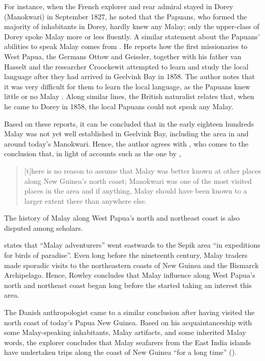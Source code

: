 {For instance, when the French explorer and rear admiral \citet[606]{DumontdUrville.1833} stayed in Dorey (Manokwari) in September 1827, he noted that the Papuans, who formed the majority of inhabitants in Dorey, hardly knew any Malay; only the upper-class of Dorey spoke Malay more or less fluently. A similar statement about the Papuans’ abilities to speak Malay comes from \citet{vanHasselt.1936}. He reports how the first missionaries to West Papua, the Germans Ottow and Geissler, together with his father van Hasselt and the  researcher Croockewit attempted to learn and study the local language after they had arrived in Geelvink Bay in 1858. The author notes that it was very difficult for them to learn the local language, as the Papuans knew little or no Malay \citep[116]{vanHasselt.1936}. Along similar lines, the British naturalist \citet[380]{Wallace.1890} relates that, when he came to Dorey in 1858, the local Papuans could not speak any Malay.



Based on these reports, it can be concluded that in the early eighteen hundreds Malay was not yet well established in Geelvink Bay, including the area in and around today’s Manokwari. Hence, the author agrees with \citet[73]{Seiler.1982}, who comes to the conclusion that, in light of accounts such as the one by \citet{DumontdUrville.1833},


\begin{quote}
[t]here is no reason to assume that Malay was better known at other places along New Guinea’s north coast; Manokwari was one of the most visited places in the area and if anything, Malay should have been known to a larger extent there than anywhere else.
\end{quote}


The history of Malay along West Papua’s north and northeast coast is also disputed among scholars.



\citet[56--57]{Rowley.1972} states that  ``Malay adventurers'' went eastwards to the Sepik area  ``in expeditions for birds of paradise''. Even long before the nineteenth century, Malay traders made sporadic visits to the northeastern coasts of New Guinea and the Bismarck Archipelago. Hence, Rowley concludes that Malay influence along West Papua’s north and northeast coast began long before the  started taking an interest this area.



The Danish anthropologist \citet{Parkinson.1900} came to a similar conclusion after having visited the north coast of today’s Papua New Guinea. Based on his acquaintanceship with some Malay-speaking inhabitants, Malay artifacts, and some inherited Malay words, the explorer concludes that Malay seafarers from the East India islands have undertaken trips along the coast of New Guinea  ``for a long time'' (\citeyear*[20--21]{Parkinson.1900}).



}
